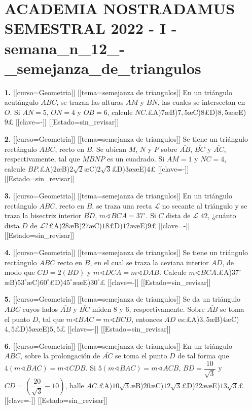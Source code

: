 \begin{enumerate}
\section*{ACADEMIA NOSTRADAMUS SEMESTRAL 2022 - I - semana\_n\_12\_-\_semejanza\_de\_triangulos}
\item[\textbf{1.}] [[curso=Geometria]] [[tema=semejanza de triangulos]] En un triángulo acutángulo $ABC$, se trazan las alturas $\overline{AM}$ y $\overline{BN}$, las cuales se intersectan en $O$. Si $AN=5$, $ON=4$ y $OB=6$, calcule $NC$.£A)$7$æB)$7,5$æC)$8$£D)$8,5$ææE)$9$£ [[clave=-]] [[Estado=sin_revisar]]
\item[\textbf{2.}] [[curso=Geometria]] [[tema=semejanza de triangulos]] Se tiene un triángulo rectángulo $ABC$, recto en $B$. Se ubican $M$, $N$ y $P$ sobre $\overline{AB}$, $\overline{BC}$ y $\overline{AC}$, respectivamente, tal que $MBNP$ es un cuadrado. Si $AM=1$ y $NC=4$, calcule $BP$.£A)$2$æB)$2\sqrt{2}$æC)$2\sqrt{3}$£D)$3$ææE)$4$£ [[clave=-]] [[Estado=sin_revisar]]
\item[\textbf{3.}] [[curso=Geometria]] [[tema=semejanza de triangulos]] En un triángulo rectángulo $ABC$, recto en $B$, se traza una recta $\mathcal{L}$ no secante al triángulo y se traza la bisectriz interior $\overline{BD}$, $m\sphericalangle BCA=37^\circ$. Si $C$ dista de $\mathcal{L}$ $42$, ¿cuánto dista $D$ de $\mathcal{L}$?£A)$28$æB)$27$æC)$18$£D)$12$ææE)$9$£ [[clave=-]] [[Estado=sin_revisar]]
\item[\textbf{4.}] [[curso=Geometria]] [[tema=semejanza de triangulos]] Se tiene un triángulo rectángulo $ABC$ recto en $B$, en el cual se traza la ceviana interior $\overline{AD}$, de modo que $CD=2(BD)$ y $m\sphericalangle DCA=m\sphericalangle DAB$. Calcule $m\sphericalangle BCA$.£A)$37^\circ$æB)$53^\circ$æC)$60^\circ$£D)$45^\circ$ææE)$30^\circ$£ [[clave=-]] [[Estado=sin_revisar]]
\item[\textbf{5.}] [[curso=Geometria]] [[tema=semejanza de triangulos]] Se da un triángulo $ABC$ cuyos lados $\overline{AB}$ y $\overline{BC}$ miden $8$ y $6$, respectivamente. Sobre $\overline{AB}$ se toma el punto $D$, tal que $m\sphericalangle BAC=m\sphericalangle BCD$, entonces $AD$ es:£A)$3,5$æB)$4$æC)$4,5$£D)$5$ææE)$5,5$£ [[clave=-]] [[Estado=sin_revisar]]
\item[\textbf{6.}] [[curso=Geometria]] [[tema=semejanza de triangulos]] En un triángulo $ABC$, sobre la prolongación de $\overline{AC}$ se toma el punto $D$ de tal forma que $4(m\sphericalangle BAC)=m\sphericalangle CDB$. Si $5(m\sphericalangle BAC)=m\sphericalangle ACB$, $BD=\dfrac{10}{\sqrt{3}}$ y $CD=\left(\dfrac{20}{\sqrt{3}}-10\right)$, halle $AC$.£A)$10\sqrt{3}$æB)$20$æC)$12\sqrt{3}$£D)$22$ææE)$13\sqrt{3}$£ [[clave=-]] [[Estado=sin_revisar]]

\end{enumerate}
